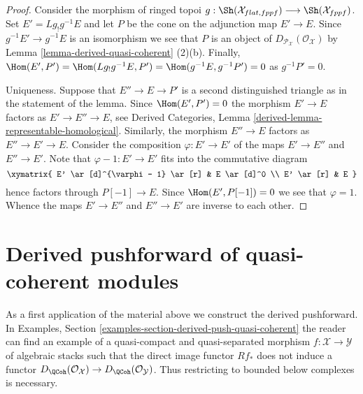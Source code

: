 \begin{proof}
Consider the morphism of ringed topoi
$g : \Sh(\mathcal{X}_{flat, fppf}) \longrightarrow \Sh(\mathcal{X}_{fppf})$.
Set $E' = Lg_!g^{-1}E$ and let $P$ be the cone on the adjunction
map $E' \to E$. Since $g^{-1}E' \to g^{-1}E$ is an isomorphism we see that
$P$ is an object of $D_{\mathcal{P}_\mathcal{X}}(\mathcal{O}_\mathcal{X})$ by
Lemma \ref{lemma-derived-quasi-coherent} (2)(b).
Finally, $\Hom(E', P') = \Hom(Lg_!g^{-1}E, P') = \Hom(g^{-1}E, g^{-1}P') = 0$
as $g^{-1}P' = 0$.

\medskip\noindent
Uniqueness. Suppose that $E'' \to E \to P'$ is a second distinguished
triangle as in the statement of the lemma. Since $\Hom(E', P') = 0$
the morphism $E' \to E$ factors as $E' \to E'' \to E$, see
Derived Categories, Lemma \ref{derived-lemma-representable-homological}.
Similarly, the morphism $E'' \to E$ factors as $E'' \to E' \to E$.
Consider the composition $\varphi : E' \to E'$ of the maps $E' \to E''$ and
$E'' \to E'$. Note that $\varphi - 1 : E' \to E'$ fits into the commutative
diagram
$$
\xymatrix{
E' \ar[d]^{\varphi - 1} \ar[r] & E \ar[d]^0 \\
E' \ar[r] & E
}
$$
hence factors through $P[-1] \to E$. Since $\Hom(E', P[-1]) = 0$
we see that $\varphi = 1$. Whence the maps $E' \to E''$ and $E'' \to E'$
are inverse to each other.
\end{proof}






\section{Derived pushforward of quasi-coherent modules}
\label{section-derived-pushforward}

\noindent
As a first application of the material above we construct the derived
pushforward. In
Examples, Section \ref{examples-section-derived-push-quasi-coherent}
the reader can find an example of a quasi-compact and quasi-separated
morphism $f : \mathcal{X} \to \mathcal{Y}$ of algebraic stacks such
that the direct image functor $Rf_*$ does not induce a functor
$D_\QCoh(\mathcal{O}_\mathcal{X}) \to
D_\QCoh(\mathcal{O}_\mathcal{Y})$. Thus restricting to bounded
below complexes is necessary.

